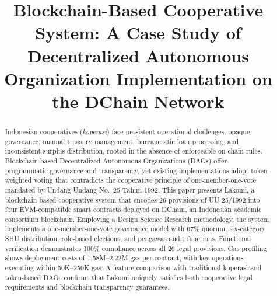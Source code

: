 \documentclass[conference]{IEEEtran}
\begin{document}
\title{Blockchain-Based Cooperative System: A Case Study of Decentralized Autonomous Organization Implementation on the DChain Network}

\author{
\and
{}
}

\maketitle

\begin{abstract}
Indonesian cooperatives (\textit{koperasi}) face persistent operational challenges, opaque governance, manual treasury management, bureaucratic loan processing, and inconsistent surplus distribution, rooted in the absence of enforceable on-chain rules. Blockchain-based Decentralized Autonomous Organizations (DAOs) offer programmatic governance and transparency, yet existing implementations adopt token-weighted voting that contradicts the cooperative principle of one-member-one-vote mandated by Undang-Undang No.~25 Tahun 1992. This paper presents Lakomi, a blockchain-based cooperative system that encodes 26 provisions of UU 25/1992 into four EVM-compatible smart contracts deployed on DChain, an Indonesian academic consortium blockchain. Employing a Design Science Research methodology, the system implements a one-member-one-vote governance model with 67\% quorum, six-category SHU distribution, role-based elections, and pengawas audit functions. Functional verification demonstrates 100\% compliance across all 26 legal provisions. Gas profiling shows deployment costs of 1.58M--2.22M gas per contract, with key operations executing within 50K--250K gas. A feature comparison with traditional koperasi and token-based DAOs confirms that Lakomi uniquely satisfies both cooperative legal requirements and blockchain transparency guarantees.
\end{abstract}
\end{document}
